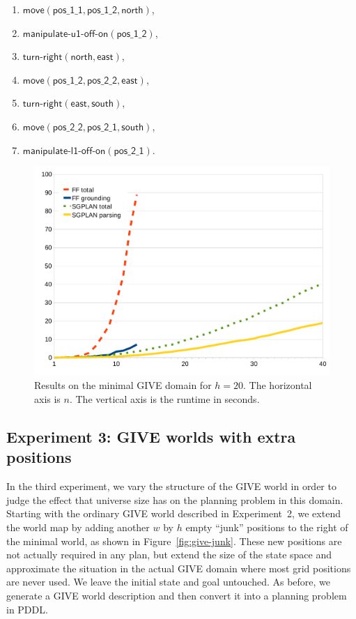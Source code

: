 \documentclass[letterpaper]{article}
\begin{document}
\begin{enumerate}
\item $\mathsf{move}(\mathsf{pos\_1\_1},\mathsf{pos\_1\_2}, \mathsf{north})$,
\item $\mathsf{manipulate}\textsf{-}\mathsf{u1}\textsf{-}\mathsf{off}\textsf{-}\mathsf{on}(\mathsf{pos\_1\_2})$,
\item $\mathsf{turn}\textsf{-}\mathsf{right}(\mathsf{north}, \mathsf{east})$,
\item $\mathsf{move}(\mathsf{pos\_1\_2}, \mathsf{pos\_2\_2},
  \mathsf{east})$,
\item $\mathsf{turn}\textsf{-}\mathsf{right}(\mathsf{east}, \mathsf{south})$,
\item $\mathsf{move}(\mathsf{pos\_2\_2}, \mathsf{pos\_2\_1}, \mathsf{south})$,
\item $\mathsf{manipulate}\textsf{-}\mathsf{l1}\textsf{-}\mathsf{off}\textsf{-}\mathsf{on}(\mathsf{pos\_2\_1})$.
\end{enumerate}


\begin{figure}[t]
  \centering
  \includegraphics[width=0.75\columnwidth]{graph-exp2}
  \caption{Results on the minimal GIVE
    domain for $h=20$. The horizontal axis is $n$. The vertical axis
    is the runtime in seconds.}
  \label{fig:give-runtime-minimal}
\end{figure}


\subsection{Experiment 3: GIVE worlds with extra positions}
\label{sec:experiment-3:-give}

In the third experiment, we vary the structure of the GIVE world in order
to judge the effect that universe size has on the planning problem in this
domain. Starting with the ordinary GIVE world described in Experiment~2, we
extend the world map by adding another $w$ by $h$ empty ``junk'' positions
to the right of the minimal world, as shown in Figure~\ref{fig:give-junk}.
These new positions are not actually required in any plan, but extend the
size of the state space and approximate the situation in the actual GIVE
domain where most grid positions are never used. We leave the initial state
and goal untouched. As before, we generate a GIVE world description and
then convert it into a planning problem in PDDL.
\end{document}
